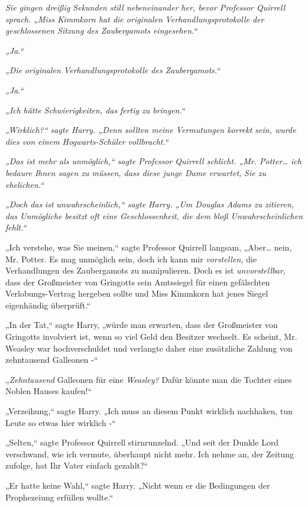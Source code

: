{\emph{Sie gingen dreißig Sekunden still nebeneinander her, bevor Professor Quirrell sprach. „Miss Kimmkorn hat die originalen} \emph{Verhandlungsprotokolle der geschlossenen Sitzung des Zaubergamots eingesehen.“}

\emph{„Ja.“}

\emph{„Die} \emph{\emph{originalen Verhandlungsprotokolle des Zaubergamots.}“}

\emph{„Ja.“}

\emph{„\emph{Ich}} \emph{hätte Schwierigkeiten, das} \emph{fertig zu bringen.“}

\emph{„Wirklich?“ sagte Harry. „Denn sollten meine Vermutungen korrekt sein, wurde dies von einem Hogwarts-Schüler vollbracht.“}

\emph{„Das ist mehr als unmöglich,“ sagte Professor Quirrell schlicht. „Mr. Potter… ich bedaure Ihnen sagen zu müssen, dass diese junge Dame erwartet,} \emph{Sie zu ehelichen.“}

\emph{„Doch} \emph{\emph{das}} \emph{ist} \emph{unwahrscheinlich,“ sagte Harry. „Um Douglas Adams zu zitieren,} \emph{das Unmögliche besitzt oft eine Geschlossenheit, die dem bloß Unwahrscheinlichen fehlt.“}

„Ich verstehe, was Sie meinen,“ sagte Professor Quirrell langsam, „Aber… nein, Mr. Potter. Es mag unmöglich sein, doch ich kann mir \emph{vorstellen,} die Verhandlungen des Zaubergamots zu manipulieren. Doch es ist \emph{unvorstellbar,} dass der Großmeister von Gringotts sein Amtssiegel für einen gefälschten Verlobungs-Vertrag hergeben sollte und Miss Kimmkorn hat jenes Siegel eigenhändig überprüft.“

„In der Tat,“ sagte Harry, „würde man erwarten, dass der Großmeister von Gringotts involviert ist, wenn so viel Geld den Besitzer wechselt. Es scheint, Mr. Weasley war hochverschuldet und verlangte daher eine zusätzliche Zahlung von zehntausend Galleonen -“

„\emph{Zehntausend} Galleonen für eine \emph{Weasley?} Dafür könnte man die Tochter eines Noblen Hauses kaufen!“

„Verzeihung,“ sagte Harry. „Ich muss an diesem Punkt wirklich nachhaken, tun Leute so etwas hier wirklich -“

„Selten,“ sagte Professor Quirrell stirnrunzelnd. „Und seit der Dunkle Lord verschwand, wie ich vermute, überhaupt nicht mehr. Ich nehme an, der Zeitung zufolge, hat Ihr Vater einfach gezahlt?“

„Er hatte keine Wahl,“ sagte Harry. „Nicht wenn er die Bedingungen der Prophezeiung erfüllen wollte.“

}
